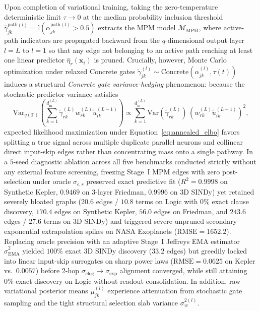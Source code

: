 \documentclass[11pt,a4paper]{article}
\begin{document}
Upon completion of variational training, taking the zero-temperature deterministic limit $\tau \to 0$ at the median probability inclusion threshold $\hat{\gamma}_{jk}^{\text{path}(l)} = \mathbb{I}(\alpha_{jk}^{\text{path}(l)} > 0.5)$ extracts the MPM model $\mathcal{M}_{\text{MPM}}$, where active-path indicators are propagated backward from the $q$-dimensional output layer $l = L$ to $l = 1$ \citep{hubin2024sparse, skaaret2024input} so that any edge not belonging to an active path reaching at least one linear predictor $\hat{\eta}_r(\bm{x}_i)$ is pruned. Crucially, however, Monte Carlo optimization under relaxed Concrete gates $\tilde{\gamma}_{jk}^{(l)} \sim \mathrm{Concrete}(\alpha_{jk}^{(l)}, \tau(t))$ induces a structural \emph{Concrete gate variance-hedging} phenomenon: because the stochastic predictor variance satisfies
\begin{equation*}
\mathrm{Var}_{q(\bm{\Gamma})}\!\left(\sum_{k=1}^{d_{\text{in}}^{(L)}} \tilde{\gamma}_{rk}^{(L)} w_{rk}^{(L)} \tilde{u}_{ik}^{(L-1)}\right) \propto \sum_{k=1}^{d_{\text{in}}^{(L)}} \mathrm{Var}(\tilde{\gamma}_{rk}^{(L)})\,(w_{rk}^{(L)} \tilde{u}_{ik}^{(L-1)})^2,
\end{equation*}
expected likelihood maximization under Equation~\eqref{eq:annealed_elbo} favors splitting a true signal across multiple duplicate parallel neurons and collinear direct input-skip edges rather than concentrating mass onto a single pathway. In a $5$-seed diagnostic ablation across all five benchmarks conducted strictly without any external feature screening, freezing Stage~I MPM edges with zero post-selection under oracle $\sigma_{\epsilon,r}$ preserved exact predictive fit ($R^2 = 0.9998$ on Synthetic Kepler, $0.9469$ on 3-layer Friedman, $0.9996$ on 3D SINDy) yet retained severely bloated graphs ($20.6$ edges / $10.8$ terms on Logic with $0\%$ exact clause discovery, $170.4$ edges on Synthetic Kepler, $56.0$ edges on Friedman, and $243.6$ edges / $27.6$ terms on 3D SINDy) and triggered severe unpruned secondary exponential extrapolation spikes on NASA Exoplanets ($\mathrm{RMSE} = 1652.2$). Replacing oracle precision with an adaptive Stage~I Jeffreys EMA estimator $\hat{\sigma}_{\text{EMA}}^2$ yielded $100\%$ exact 3D SINDy discovery ($33.2$ edges) but greedily locked into linear input-skip surrogates on sharp power laws ($\mathrm{RMSE} = 0.0625$ on Kepler vs.\ $0.0057$) before 2-hop $\sigma_{\text{clog}} \to \sigma_{\exp}$ alignment converged, while still attaining $0\%$ exact discovery on Logic without readout consolidation. In addition, raw variational posterior means $\mu_{jk}^{(l)}$ experience attenuation from stochastic gate sampling and the tight structural selection slab variance $\sigma_w^{2(l)}$.
\end{document}
